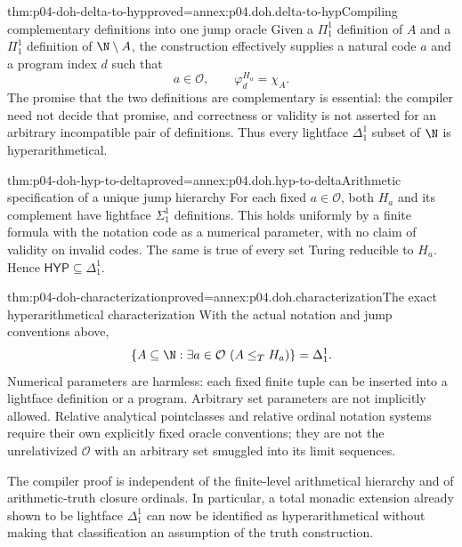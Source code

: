 \begin{hbtheorem}{thm:p04-doh-delta-to-hyp}{proved=annex:p04.doh.delta-to-hyp}{Compiling complementary definitions into one jump oracle}
Given a \(\Pi^1_1\) definition of \(A\) and a \(\Pi^1_1\) definition of
\(\N\setminus A\), the construction effectively supplies a natural code
\(a\) and a program index \(d\) such that
\[
 a\in\mathcal O,\qquad \varphi_d^{H_a}=\chi_A.
\]
The promise that the two definitions are complementary is essential:
the compiler need not decide that promise, and correctness or validity is
not asserted for an arbitrary incompatible pair of definitions.
Thus every lightface \(\Delta^1_1\) subset of \(\N\) is hyperarithmetical.
\end{hbtheorem}

\begin{hbtheorem}{thm:p04-doh-hyp-to-delta}{proved=annex:p04.doh.hyp-to-delta}{Arithmetic specification of a unique jump hierarchy}
For each fixed \(a\in\mathcal O\), both \(H_a\) and its complement have
lightface \(\Sigma^1_1\) definitions. This holds uniformly by a finite
formula with the notation code as a numerical parameter, with no claim of
validity on invalid codes. The same is true of every set Turing reducible
to \(H_a\). Hence \(\mathsf{HYP}\subseteq\Delta^1_1\).
\end{hbtheorem}

\begin{hbcorollary}{thm:p04-doh-characterization}{proved=annex:p04.doh.characterization}{The exact hyperarithmetical characterization}
With the actual notation and jump conventions above,
\[
 \{A\subseteq\N:\exists a\in\mathcal O\ (A\leq_T H_a)\}
       =\Delta^1_1.
\]
Numerical parameters are harmless: each fixed finite tuple can be inserted
into a lightface definition or a program. Arbitrary set parameters are not
implicitly allowed. Relative analytical pointclasses and relative ordinal
notation systems require their own explicitly fixed oracle conventions;
they are not the unrelativized \(\mathcal O\) with an arbitrary set
smuggled into its limit sequences.
\end{hbcorollary}

The compiler proof is independent of the finite-level arithmetical hierarchy
and of arithmetic-truth closure ordinals. In particular, a total monadic
extension already shown to be lightface \(\Delta^1_1\) can now be identified
as hyperarithmetical without making that classification an assumption of
the truth construction.
